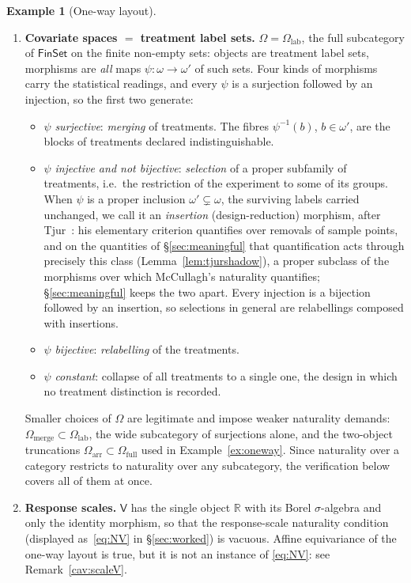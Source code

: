 \documentclass[11pt,a4paper]{article}
\theoremstyle{plain}
\theoremstyle{definition}
\newtheorem{example}[theorem]{Example}
\theoremstyle{remark}
\newcommand{\cat}[1]{\mathsf{#1}}
\newcommand{\catV}{\cat{V}}
\newcommand{\catO}{\cat{\Omega}}
\newcommand{\FinSet}{\cat{FinSet}}
\newcommand{\R}{\mathbb{R}}
\begin{document}
\begin{example}[One-way layout]
\begin{enumerate}
\item \textbf{Covariate spaces $=$ treatment label sets.} $\catO =
\catO_{\mathrm{lab}}$, the full subcategory of $\FinSet$ on the finite
non-empty sets: objects are treatment label sets, morphisms are \emph{all}
maps $\psi \colon \omega \to \omega'$ of such sets. Four kinds of morphisms
carry the statistical readings, and every $\psi$ is a surjection followed by
an injection, so the first two generate:
\begin{itemize}
\item $\psi$ \emph{surjective}: \emph{merging} of treatments. The fibres
$\psi^{-1}(b)$, $b \in \omega'$, are the blocks of treatments declared
indistinguishable.
\item $\psi$ \emph{injective and not bijective}: \emph{selection} of a proper
subfamily of treatments, i.e.\ the restriction of the experiment to some of
its groups. When $\psi$ is a proper inclusion $\omega' \subsetneq \omega$,
the surviving labels carried unchanged, we call it an \emph{insertion}
(design-reduction) morphism, after
Tjur~\cite[p.~1299]{tjur_discussion_2002}: his elementary criterion
quantifies over removals of sample points, and on the quantities of
\S\ref{sec:meaningful} that quantification acts through precisely this
class (Lemma~\ref{lem:tjurshadow}), a proper subclass of the morphisms over
which McCullagh's naturality quantifies; \S\ref{sec:meaningful} keeps the
two apart. Every injection is a bijection followed by an insertion, so
selections in general are relabellings composed with insertions.
\item $\psi$ \emph{bijective}: \emph{relabelling} of the treatments.
\item $\psi$ \emph{constant}: collapse of all treatments to a single one, the
design in which no treatment distinction is recorded.
\end{itemize}
Smaller choices of $\catO$ are legitimate and impose weaker naturality
demands: $\catO_{\mathrm{merge}} \subset \catO_{\mathrm{lab}}$, the wide
subcategory of surjections alone, and the two-object truncations
$\catO_{\mathrm{arr}} \subset \catO_{\mathrm{full}}$ used in
Example~\ref{ex:oneway}. Since naturality over a category restricts to
naturality over any subcategory, the verification below covers all of them at
once.

\item \textbf{Response scales.} $\catV$ has the single object $\R$ with its
Borel $\sigma$-algebra and only the identity morphism, so that the
response-scale naturality condition (displayed as~\eqref{eq:NV} in
\S\ref{sec:worked}) is vacuous. Affine equivariance of the one-way layout is true, but it is not an instance of \eqref{eq:NV}: see
Remark~\ref{cav:scaleV}.


\end{enumerate}
\end{example}
\end{document}
